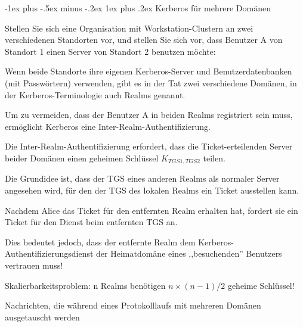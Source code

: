\documentclass[a4paper]{article}
\makeatletter
\renewcommand{\subsubsection}{\@startsection{subsubsection}{3}{0mm}%
 {-1ex plus -.5ex minus -.2ex}%
 {1ex plus .2ex}%
 {\normalfont\small\bfseries}}
\makeatother
\begin{document}
\begin{multicols}{3}
      \subsubsection{Kerberos für mehrere Domänen}
      \begin{itemize*}
            \item Stellen Sie sich eine Organisation mit Workstation-Clustern an zwei verschiedenen Standorten vor, und stellen Sie sich vor, dass Benutzer A von Standort 1 einen Server von Standort 2 benutzen möchte:
            \begin{itemize*}
                  \item Wenn beide Standorte ihre eigenen Kerberos-Server und Benutzerdatenbanken (mit Passwörtern) verwenden, gibt es in der Tat zwei verschiedene Domänen, in der Kerberos-Terminologie auch Realms genannt.
                  \item Um zu vermeiden, dass der Benutzer A in beiden Realms registriert sein muss, ermöglicht Kerberos eine Inter-Realm-Authentifizierung.
            \end{itemize*}
            \item Die Inter-Realm-Authentifizierung erfordert, dass die Ticket-erteilenden Server beider Domänen einen geheimen Schlüssel $K_{TGS1,TGS2}$ teilen.
            \begin{itemize*}
                  \item Die Grundidee ist, dass der TGS eines anderen Realms als normaler Server angesehen wird, für den der TGS des lokalen Realms ein Ticket ausstellen kann.
                  \item Nachdem Alice das Ticket für den entfernten Realm erhalten hat, fordert sie ein Ticket für den Dienst beim entfernten TGS an.
                  \item Dies bedeutet jedoch, dass der entfernte Realm dem Kerberos-Authentifizierungsdienst der Heimatdomäne eines ,,besuchenden'' Benutzers vertrauen muss!
                  \item Skalierbarkeitsproblem: n Realms benötigen $n\times(n-1)/2$ geheime Schlüssel!
            \end{itemize*}
            \item Nachrichten, die während eines Protokolllaufs mit mehreren Domänen ausgetauscht werden
            \begin{enumerate*}
                  \def\labelenumi{\arabic{enumi}.}

\end{enumerate*}
\end{itemize*}
\end{multicols}
\end{document}
